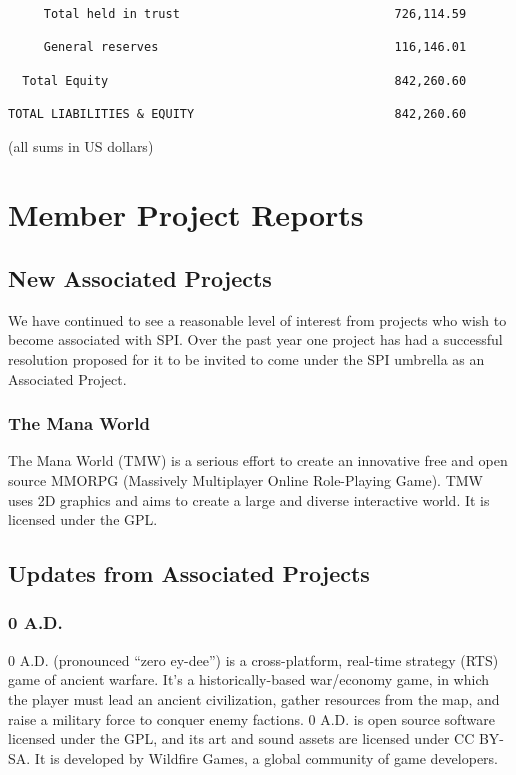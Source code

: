 \documentclass[letterpaper]{report}
\begin{document}
\begin{verbatim}
     Total held in trust                              726,114.59

     General reserves                                 116,146.01

  Total Equity                                        842,260.60

TOTAL LIABILITIES & EQUITY                            842,260.60
\end{verbatim}

(all sums in US dollars)


\chapter{Member Project Reports}

\section{New Associated Projects}

We have continued to see a reasonable level of interest from projects who wish
to become associated with SPI.  Over the past year one project has had
a successful resolution proposed for it to be invited to come under the SPI
umbrella as an Associated Project.


\subsection{The Mana World}

The Mana World (TMW) is a serious effort to create an innovative free and
open source MMORPG (Massively Multiplayer Online Role-Playing Game).  TMW
uses 2D graphics and aims to create a large and diverse interactive world.
It is licensed under the GPL.

\section{Updates from Associated Projects}

\subsection{0 A.D.}

0 A.D. (pronounced ``zero ey-dee'') is a cross-platform, real-time strategy
(RTS) game of ancient warfare. It's a historically-based war/economy game,
in which the player must lead an ancient civilization, gather resources
from the map, and raise a military force to conquer enemy factions. 0 A.D.
is open source software licensed under the GPL, and its art and sound
assets are licensed under CC BY-SA. It is developed by Wildfire Games, a
global community of game developers.
\end{document}
